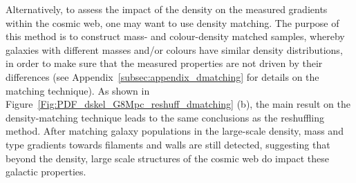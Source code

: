 \documentclass[useAMS,usenatbib]{mnras}
\begin{document}
Alternatively, to assess the impact of the density on the measured gradients within the cosmic web, one may want to use density matching. The purpose of this method is to construct mass- and colour-density matched samples, whereby galaxies with different masses and/or colours have similar density distributions, in order to make sure that the measured properties are not driven by their differences (see Appendix~\ref{subsec:appendix_dmatching} for details on the matching technique). 
As shown in Figure~\ref{Fig:PDF_dskel_G8Mpc_reshuff_dmatching} (b), the main result on the density-matching technique leads to the same conclusions as the reshuffling method. 
After matching galaxy populations in the large-scale density, mass and type gradients towards filaments and walls are still detected, suggesting that beyond the density, large scale structures of the cosmic web do impact  these galactic properties.
\end{document}
